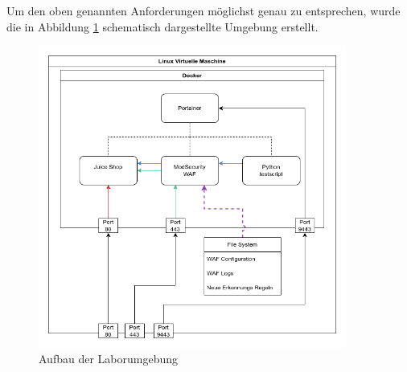 Um den oben genannten Anforderungen möglichst genau zu entsprechen, wurde die in Abbildung \ref{fig:lab} schematisch dargestellte Umgebung erstellt.

\begin{figure}[!hbt]
    \centering
    \includegraphics[width=0.9\textwidth]{./images/lab-setup.png}
    \caption{Aufbau der Laborumgebung}
    \label{fig:lab}
\end{figure}

